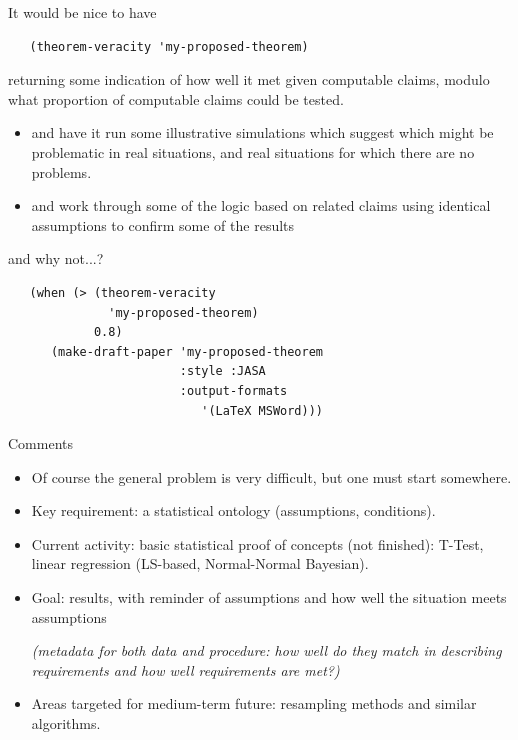 \documentclass{beamer}
\begin{document}
\begin{frame}[fragile]{It would be nice to have}
\begin{verbatim}
   (theorem-veracity 'my-proposed-theorem)
\end{verbatim}
returning some indication of how well it met given computable claims,
modulo what proportion of computable claims could be tested.
\begin{itemize}
\item and have it run some illustrative simulations which suggest
  which might be problematic in real situations, and real situations
  for which there are no problems.
\item and work through some of the logic based on related claims using
  identical assumptions to confirm some of the results
\end{itemize}
\end{frame}

\begin{frame}[fragile]{and why not...?}
\begin{verbatim}
   (when (> (theorem-veracity
              'my-proposed-theorem)
            0.8)
      (make-draft-paper 'my-proposed-theorem
                        :style :JASA
                        :output-formats
                           '(LaTeX MSWord)))
\end{verbatim}
\end{frame}

\begin{frame}{Comments}
  \begin{itemize}
  \item Of course the general problem is very difficult, but one must
    start somewhere.
  \item Key requirement:  a statistical ontology (assumptions,
    conditions).
  \item Current activity: basic statistical proof of concepts (not
    finished): T-Test, linear regression (LS-based, Normal-Normal
    Bayesian).
  \item Goal: results, with reminder of assumptions and how well the
    situation meets assumptions 

    \emph{(metadata for both data and procedure: how well do they match in
    describing requirements and how well requirements are met?)}
  \item Areas targeted for medium-term future: resampling methods and
    similar algorithms.
  \end{itemize}
\end{frame}
\end{document}
